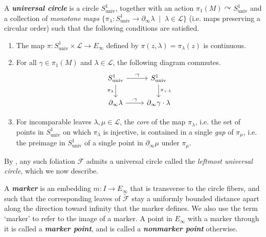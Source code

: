 \documentclass[11pt]{amsart}
\renewcommand{\l}{\lambda}
\newcommand{\wt}{\widetilde}
\newcommand{\mc}{\mathcal}
\newcommand{\defn}[1]{\textbf{\emph{#1}}}
\newcommand{\univ}{S^1_{\mathrm{univ}}}
\numberwithin{equation}{section}
\theoremstyle{definition}
\begin{document}
\begin{definition}\label{def:uc}
A \defn{universal circle} is a circle $\univ$, together with an action $\pi_1(M)\curvearrowright\univ$ and a collection of \emph{monotone maps} $\{\pi_\l\colon\univ\to\partial_\infty\l\;\mid\;\l\in\mc L\}$ (i.e. maps preserving a circular order) such that the following conditions are satisfied.

\begin{enumerate}
	\item The map $\pi\colon \univ\times\mc L\to E_\infty$ defined by $\pi(z,\l)=\pi_\l(z)$ is continuous.
	\item For all $\gamma\in\pi_1(M)$ and $\l\in\mc L$, the following diagram commutes. 
	\[\begin{tikzcd}
		\univ & \univ \\
		{\partial_\infty\l} & {\partial_\infty\gamma\cdot\l}
		\arrow["{\cdot\gamma}", from=1-1, to=1-2]
		\arrow["{\pi_\l}"', from=1-1, to=2-1]
		\arrow["{\pi_{\gamma\cdot\l}}", from=1-2, to=2-2]
		\arrow["{\cdot\gamma}", from=2-1, to=2-2]
	\end{tikzcd}\]

	\item For incomparable leaves $\l,\mu\in\mc L$, the \emph{core} of the map $\pi_\l$, i.e. the set of points in $\univ$ on which $\pi_\l$ is injective, is contained in a single \emph{gap} of $\pi_\mu$, i.e. the preimage in $\univ$ of a single point in $\partial_\infty\mu$ under $\pi_\mu$.
\end{enumerate}
\end{definition}

By \cite{CalDun_UC}, any such foliation $\mc F$ admits a universal circle called the \emph{leftmost universal circle}, which we now describe.

A \defn{marker} is an embedding $m \colon I\to E_\infty$ that is transverse to the circle fibers, and such that the corresponding leaves of $\wt{\mc F}$ stay a uniformly bounded distance apart along the direction toward infinity that the marker defines. We also use the term `marker' to refer to the image of a marker. A point in $E_\infty$ with a marker through it is called a \defn{marker point}, and is called a \defn{nonmarker point} otherwise.
\end{document}
